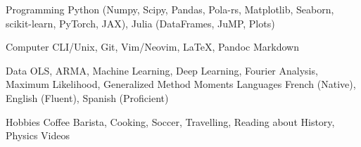 

\begin{cvskills}

	\cvskill
	{Programming} %
	{Python (Numpy, Scipy, Pandas, Pola-rs, Matplotlib, Seaborn, scikit-learn, PyTorch, JAX), Julia (DataFrames, JuMP, Plots)}  %

	\cvskill
	{Computer}
	{CLI/Unix, Git, Vim/Neovim, \LaTeX, Pandoc Markdown}

	\cvskill
	{Data}
	{OLS, ARMA, Machine Learning, Deep Learning, Fourier Analysis, Maximum Likelihood, Generalized Method Moments}
	\cvskill
	{Languages} %
	{French (Native), English (Fluent), Spanish (Proficient)} %

	\cvskill
	{Hobbies}
	{Coffee Barista, Cooking, Soccer, Travelling, Reading about History, Physics Videos}
\end{cvskills}
